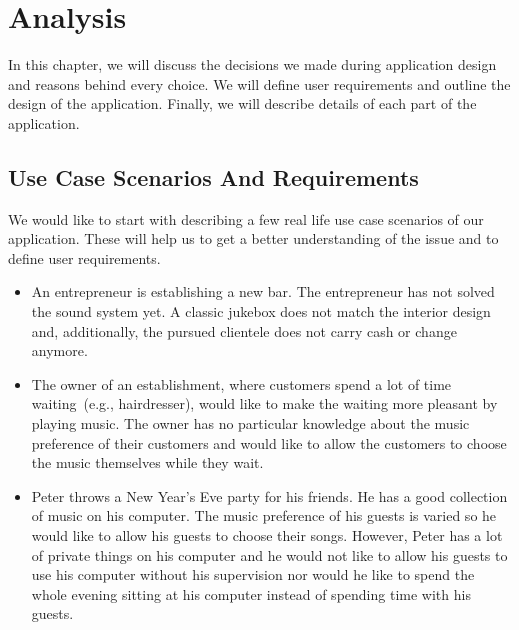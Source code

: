\chapter{Analysis}

In this chapter, we will discuss the decisions we made during application design and reasons behind every choice. We will define user requirements and outline the design of the application. Finally, we will describe details of each part of the application.

\section{Use Case Scenarios And Requirements}

We would like to start with describing a few real life use case scenarios of our application. These will help us to get a better understanding of the issue and to define user requirements.
\begin{itemize}
    \item An entrepreneur is establishing a new bar. The entrepreneur has not solved the sound system yet. A classic jukebox does not match the interior design and, additionally, the pursued clientele does not carry cash or change anymore.
    \item The owner of an establishment, where customers spend a lot of time waiting~(e.g., hairdresser), would like to make the waiting more pleasant by playing music. The owner has no particular knowledge about the music preference of their customers and would like to allow the customers to choose the music themselves while they wait.
    \item Peter throws a New Year's Eve party for his friends. He has a good collection of music on his computer. The music preference of his guests is varied so he would like to allow his guests to choose their songs. However, Peter has a lot of private things on his computer and he would not like to allow his guests to use his computer without his supervision nor would he like to spend the whole evening sitting at his computer instead of spending time with his guests.
\end{itemize}


